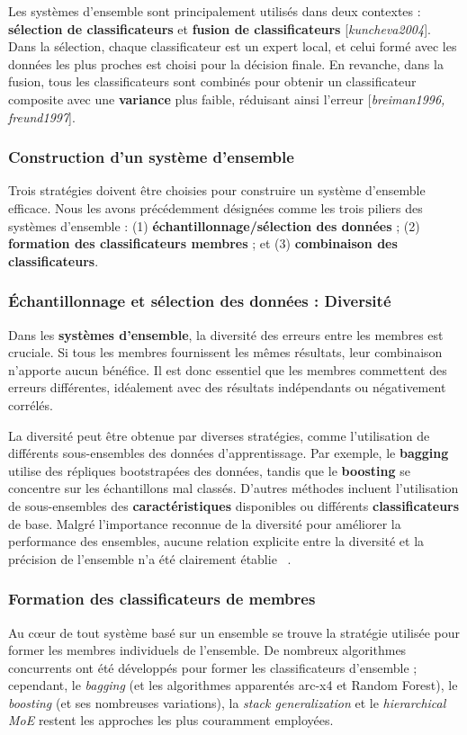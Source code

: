 Les systèmes d'ensemble sont principalement utilisés dans deux contextes : \textbf{sélection de classificateurs} et \textbf{fusion de classificateurs} [\textit{kuncheva2004}]. Dans la sélection, chaque classificateur est un expert local, et celui formé avec les données les plus proches est choisi pour la décision finale. En revanche, dans la fusion, tous les classificateurs sont combinés pour obtenir un classificateur composite avec une \textbf{variance} plus faible, réduisant ainsi l'erreur [\textit{breiman1996, freund1997}].
\subsubsection*{Construction d'un système d'ensemble}
Trois stratégies doivent être choisies pour construire un système d'ensemble efficace. Nous les avons précédemment désignées comme les trois piliers des systèmes d'ensemble : (1) \textbf{échantillonnage/sélection des données} ; (2) \textbf{formation des classificateurs membres} ; et (3) \textbf{combinaison des classificateurs}.

\subsubsection{Échantillonnage et sélection des données : Diversité}
Dans les \textbf{systèmes d'ensemble}, la diversité des erreurs entre les membres est cruciale. Si tous les membres fournissent les mêmes résultats, leur combinaison n'apporte aucun bénéfice. Il est donc essentiel que les membres commettent des erreurs différentes, idéalement avec des résultats indépendants ou négativement corrélés.

La diversité peut être obtenue par diverses stratégies, comme l'utilisation de différents sous-ensembles des données d'apprentissage. Par exemple, le \textbf{bagging} utilise des répliques bootstrapées des données, tandis que le \textbf{boosting} se concentre sur les échantillons mal classés. D'autres méthodes incluent l'utilisation de sous-ensembles des \textbf{caractéristiques} disponibles ou différents \textbf{classificateurs} de base. Malgré l'importance reconnue de la diversité pour améliorer la performance des ensembles, aucune relation explicite entre la diversité et la précision de l'ensemble n'a été clairement établie ~\cite{polikar2012ensemble}.

\subsubsection{Formation des classificateurs de membres}
Au cœur de tout système basé sur un ensemble se trouve la stratégie utilisée pour former les membres individuels de l'ensemble. De nombreux algorithmes concurrents ont été développés pour former les classificateurs d'ensemble ; cependant, le \textit{bagging} (et les algorithmes apparentés arc-x4 et Random Forest), le \textit{boosting} (et ses nombreuses variations), la \textit{stack generalization} et le \textit{hierarchical MoE} restent les approches les plus couramment employées.

